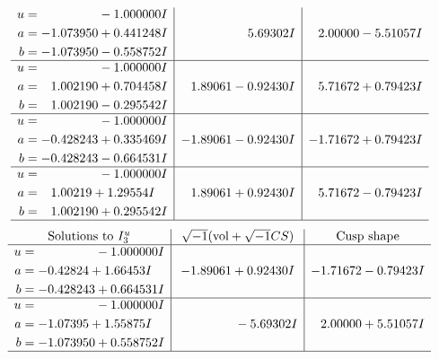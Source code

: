 \documentclass[1p]{elsarticle_modified}
\theoremstyle{definition}
\newcommand{\I}{\sqrt{-1}}
\begin{document}
$$\begin{array}{c|c|c}
\begin{aligned}
u &= \phantom{-0.000000 } -1.000000 I \\
a &= -1.073950 + 0.441248 I \\
b &= -1.073950 - 0.558752 I\end{aligned}
 & \phantom{-0.000000 -}5.69302 I & \phantom{-}2.00000 - 5.51057 I \\ \hline\begin{aligned}
u &= \phantom{-0.000000 } -1.000000 I \\
a &= \phantom{-}1.002190 + 0.704458 I \\
b &= \phantom{-}1.002190 - 0.295542 I\end{aligned}
 & \phantom{-}1.89061 - 0.92430 I & \phantom{-}5.71672 + 0.79423 I \\ \hline\begin{aligned}
u &= \phantom{-0.000000 } -1.000000 I \\
a &= -0.428243 + 0.335469 I \\
b &= -0.428243 - 0.664531 I\end{aligned}
 & -1.89061 - 0.92430 I & -1.71672 + 0.79423 I \\ \hline\begin{aligned}
u &= \phantom{-0.000000 } -1.000000 I \\
a &= \phantom{-}1.00219 + 1.29554 I \\
b &= \phantom{-}1.002190 + 0.295542 I\end{aligned}
 & \phantom{-}1.89061 + 0.92430 I & \phantom{-}5.71672 - 0.79423 I\\
 \hline 
 \end{array}$$\newpage$$\begin{array}{c|c|c}  
\text{Solutions to }I^u_{3}& \I (\text{vol} + \sqrt{-1}CS) & \text{Cusp shape}\\
 \hline 
\begin{aligned}
u &= \phantom{-0.000000 } -1.000000 I \\
a &= -0.42824 + 1.66453 I \\
b &= -0.428243 + 0.664531 I\end{aligned}
 & -1.89061 + 0.92430 I & -1.71672 - 0.79423 I \\ \hline\begin{aligned}
u &= \phantom{-0.000000 } -1.000000 I \\
a &= -1.07395 + 1.55875 I \\
b &= -1.073950 + 0.558752 I\end{aligned}
 & \phantom{-0.000000 } -5.69302 I & \phantom{-}2.00000 + 5.51057 I\\
 \hline 
 \end{array}$$\newpage\newpage\renewcommand{\arraystretch}{1}
\end{document}
